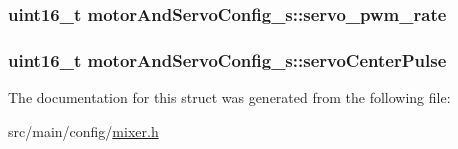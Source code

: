 \hypertarget{structmotorAndServoConfig__s_a7e2ee09b7c42bfa3da9d7658c03b77cf}{
\subsubsection[{servo\+\_\+pwm\+\_\+rate}]{\setlength{\rightskip}{0pt plus 5cm}uint16\+\_\+t motor\+And\+Servo\+Config\+\_\+s\+::servo\+\_\+pwm\+\_\+rate}}\label{structmotorAndServoConfig__s_a7e2ee09b7c42bfa3da9d7658c03b77cf}
\hypertarget{structmotorAndServoConfig__s_acd5fefdc80ca81f28d20ecd23f0222f6}{
\subsubsection[{servo\+Center\+Pulse}]{\setlength{\rightskip}{0pt plus 5cm}uint16\+\_\+t motor\+And\+Servo\+Config\+\_\+s\+::servo\+Center\+Pulse}}\label{structmotorAndServoConfig__s_acd5fefdc80ca81f28d20ecd23f0222f6}


The documentation for this struct was generated from the following file\+:\begin{DoxyCompactItemize}
\item 
src/main/config/\hyperlink{config_2mixer_8h}{mixer.\+h}\end{DoxyCompactItemize}
